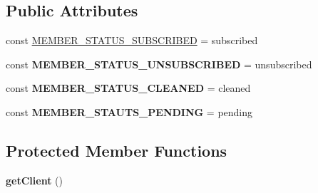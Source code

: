 \subsection*{Public Attributes}
\begin{DoxyCompactItemize}
\item 
const \hyperlink{classDMA_1_1Friends_1_1Classes_1_1Mailchimp_1_1BaseMailchimpClient_ab8ce8a5ff60b428f9af63c4a7ff9bbcf}{M\+E\+M\+B\+E\+R\+\_\+\+S\+T\+A\+T\+U\+S\+\_\+\+S\+U\+B\+S\+C\+R\+I\+B\+E\+D} = \textquotesingle{}subscribed\textquotesingle{}
\item 
\hypertarget{classDMA_1_1Friends_1_1Classes_1_1Mailchimp_1_1BaseMailchimpClient_a3b3e2c69c2f8705f9193bbb8579e216f}{}const {\bfseries M\+E\+M\+B\+E\+R\+\_\+\+S\+T\+A\+T\+U\+S\+\_\+\+U\+N\+S\+U\+B\+S\+C\+R\+I\+B\+E\+D} = \textquotesingle{}unsubscribed\textquotesingle{}\label{classDMA_1_1Friends_1_1Classes_1_1Mailchimp_1_1BaseMailchimpClient_a3b3e2c69c2f8705f9193bbb8579e216f}

\item 
\hypertarget{classDMA_1_1Friends_1_1Classes_1_1Mailchimp_1_1BaseMailchimpClient_a1b86d06e504071cf7d3f64b816c851b1}{}const {\bfseries M\+E\+M\+B\+E\+R\+\_\+\+S\+T\+A\+T\+U\+S\+\_\+\+C\+L\+E\+A\+N\+E\+D} = \textquotesingle{}cleaned\textquotesingle{}\label{classDMA_1_1Friends_1_1Classes_1_1Mailchimp_1_1BaseMailchimpClient_a1b86d06e504071cf7d3f64b816c851b1}

\item 
\hypertarget{classDMA_1_1Friends_1_1Classes_1_1Mailchimp_1_1BaseMailchimpClient_a76e1e623981a4d9d78eee8fdbe4d9771}{}const {\bfseries M\+E\+M\+B\+E\+R\+\_\+\+S\+T\+A\+U\+T\+S\+\_\+\+P\+E\+N\+D\+I\+N\+G} = \textquotesingle{}pending\textquotesingle{}\label{classDMA_1_1Friends_1_1Classes_1_1Mailchimp_1_1BaseMailchimpClient_a76e1e623981a4d9d78eee8fdbe4d9771}

\end{DoxyCompactItemize}
\subsection*{Protected Member Functions}
\begin{DoxyCompactItemize}
\item 
\hypertarget{classDMA_1_1Friends_1_1Classes_1_1Mailchimp_1_1BaseMailchimpClient_addab4174c730f2d644a39ffd7f9aa7c0}{}{\bfseries get\+Client} ()\label{classDMA_1_1Friends_1_1Classes_1_1Mailchimp_1_1BaseMailchimpClient_addab4174c730f2d644a39ffd7f9aa7c0}

\end{DoxyCompactItemize}


